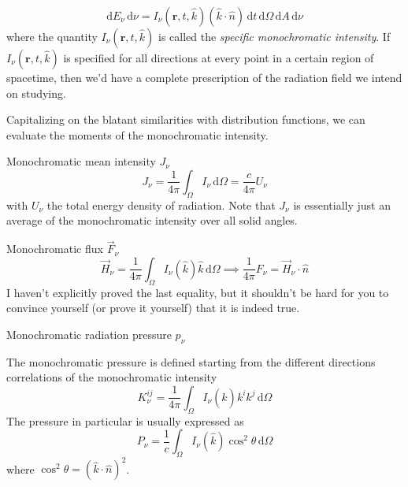 \begin{equation}
	\text{d}E_{\nu}\,\text{d}\nu = I_{\nu}(\textbf{r}, t, \textbf{$\hat{k}$}) (\textbf{$\hat{k}$} \cdot \textbf{$\hat{n}$}) \, \text{d}t \, \text{d}\Omega \, \text{d}A \, \text{d}\nu
    \label{eq:specificintensity}
\end{equation}
where the quantity $I_{\nu}(\textbf{r}, t, \textbf{$\hat{k}$})$ is called the \emph{specific monochromatic intensity}. If $I_{\nu}(\textbf{r}, t, \textbf{$\hat{k}$})$ is specified for all directions at every point in a certain region of spacetime, then we'd have a complete prescription of the radiation field we intend on studying.
\par Capitalizing on the blatant similarities with distribution functions, we can evaluate the moments of the monochromatic intensity.
\begin{definition}{Monochromatic mean intensity $J_{\nu}$}
	\begin{equation*}
		J_{\nu} = \frac{1}{4\pi} \int_{\Omega} I_{\nu}\, \text{d}\Omega = \frac{c}{4\pi} U_{\nu}
	\end{equation*}
	with $U_{\nu}$ the total energy density of radiation.
	Note that $J_{\nu}$ is essentially just an average of the monochromatic intensity over all solid angles.
\end{definition}
\begin{definition}{Monochromatic flux $\vec{F}_{\nu}$}
	\begin{equation*}
		\vec{H}_{\nu} = \frac{1}{4\pi} \int_{\Omega} I_{\nu}(\textbf{$\hat{k}$})\textbf{$\hat{k}$}\, \text{d}\Omega \implies  \frac{1}{4\pi} F_{\nu} = \vec{H}_{\nu}\cdot \hat{n}
	\end{equation*}
	I haven't explicitly proved the last equality, but it shouldn't be hard for you to convince yourself (or prove it yourself) that it is indeed true.
\end{definition}
\begin{definition}{Monochromatic radiation pressure $p_{\nu}$}
	\par The monochromatic pressure is defined starting from the different directions correlations of the monochromatic intensity 
	\begin{equation*}
		K_{\nu}^{ij} = \frac{1}{4\pi} \int_{\Omega} I_{\nu}(\textbf{$\hat{k}$})\textbf{$k^{i}$}\textbf{$k^{j}$}\, \text{d}\Omega 
	\end{equation*}
	The pressure in particular is usually expressed as
	\begin{equation*}
		P_{\nu} = \frac{1}{c} \int_{\Omega} I_{\nu}(\textbf{$\hat{k}$}) \cos^{2}\theta\,\text{d}\Omega
	\end{equation*}
	where $\cos^{2}\theta = (\textbf{$\hat{k}$} \cdot \textbf{$\hat{n}$})^{2}$.
\end{definition}

